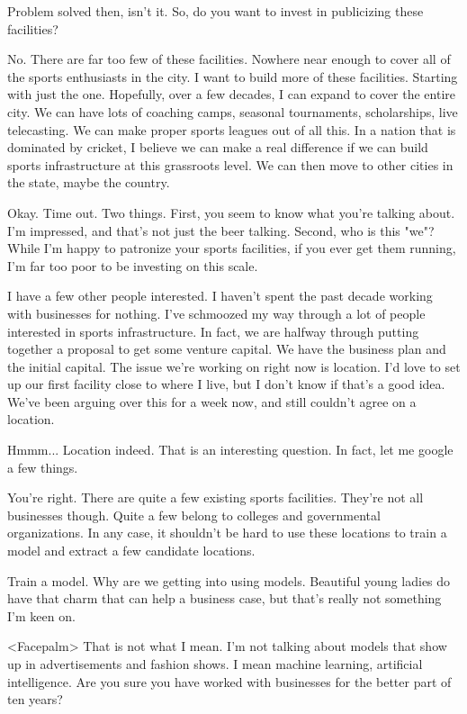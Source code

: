Problem solved then, isn't it. So, do you want to invest in publicizing these facilities?

{\color{blue} No. There are far too few of these facilities. Nowhere near enough to cover all of the sports enthusiasts in the city. I want to build more of these facilities. Starting with just the one. Hopefully, over a few decades, I can expand to cover the entire city. We can have lots of coaching camps, seasonal tournaments, scholarships, live telecasting. We can make proper sports leagues out of all this. In a nation that is dominated by cricket, I believe we can make a real difference if we can build sports infrastructure at this grassroots level. We can then move to other cities in the state, maybe the country.}

Okay. Time out. Two things. First, you seem to know what you're talking about. I'm impressed, and that's not just the beer talking. Second, who is this "we"? While I'm happy to patronize your sports facilities, if you ever get them running, I'm far too poor to be investing on this scale. 

{\color{blue} I have a few other people interested. I haven't spent the past decade working with businesses for nothing. I've schmoozed my way through a lot of people interested in sports infrastructure. In fact, we are halfway through putting together a proposal to get some venture capital. We have the business plan and the initial capital. The issue we're working on right now is location. I'd love to set up our first facility close to where I live, but I don't know if that's a good idea. We've been arguing over this for a week now, and still couldn't agree on a location.}

Hmmm... Location indeed. That is an interesting question. In fact, let me google a few things. 

You're right. There are quite a few existing sports facilities. They're not all businesses though. Quite a few belong to colleges and governmental organizations. In any case, it shouldn't be hard to use these locations to train a model and extract a few candidate locations. 

{\color{blue} Train a model. Why are we getting into using models. Beautiful young ladies do have that charm that can help a business case, but that's really not something I'm keen on.}

<Facepalm> That is not what I mean. I'm not talking about models that show up in advertisements and fashion shows. I mean machine learning, artificial intelligence. Are you sure you have worked with businesses for the better part of ten years?

